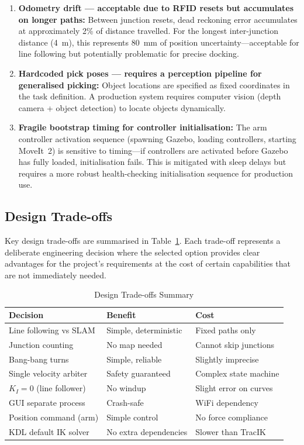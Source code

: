 \documentclass[12pt,a4paper,oneside]{report}
\begin{document}
\begin{enumerate}
\item \textbf{Odometry drift --- acceptable due to RFID resets but accumulates on longer paths:} Between junction resets, dead reckoning error accumulates at approximately 2\% of distance travelled. For the longest inter-junction distance (4~m), this represents 80~mm of position uncertainty---acceptable for line following but potentially problematic for precise docking.

\item \textbf{Hardcoded pick poses --- requires a perception pipeline for generalised picking:} Object locations are specified as fixed coordinates in the task definition. A production system requires computer vision (depth camera + object detection) to locate objects dynamically.

\item \textbf{Fragile bootstrap timing for controller initialisation:} The arm controller activation sequence (spawning Gazebo, loading controllers, starting MoveIt~2) is sensitive to timing---if controllers are activated before Gazebo has fully loaded, initialisation fails. This is mitigated with sleep delays but requires a more robust health-checking initialisation sequence for production use.
\end{enumerate}

\subsection{Design Trade-offs}

Key design trade-offs are summarised in Table~\ref{tab:tradeoffs}. Each trade-off represents a deliberate engineering decision where the selected option provides clear advantages for the project's requirements at the cost of certain capabilities that are not immediately needed.

\begin{table}[H]
\centering
\caption{Design Trade-offs Summary}
\label{tab:tradeoffs}
\begin{tabular}{p{3.5cm} p{4cm} p{4.5cm}}
\toprule
\textbf{Decision} & \textbf{Benefit} & \textbf{Cost} \\
\midrule
Line following vs SLAM & Simple, deterministic & Fixed paths only \\
Junction counting & No map needed & Cannot skip junctions \\
Bang-bang turns & Simple, reliable & Slightly imprecise \\
Single velocity arbiter & Safety guaranteed & Complex state machine \\
$K_I = 0$ (line follower) & No windup & Slight error on curves \\
GUI separate process & Crash-safe & WiFi dependency \\
Position command (arm) & Simple control & No force compliance \\
KDL default IK solver & No extra dependencies & Slower than TracIK \\
\bottomrule
\end{tabular}
\end{table}
\end{document}
